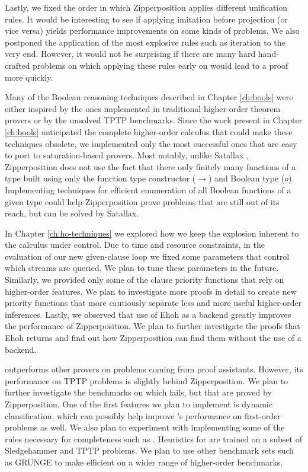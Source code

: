 Lastly, we fixed the order in which Zipperposition applies different unification
rules. It would be interesting to see if applying imitation before projection
(or vice versa) yields performance improvements on some kinds of problems. 
We also postponed the application of the most explosive rules such as iteration
to the very end. However, it would not be surprising if there are many hard hand-crafted
problems on which applying these rules early on would lead to a proof more quickly.

 Many of the Boolean reasoning
techniques described in Chapter \ref{ch:bools} were either inspired by the ones
implemented in traditional higher-order theorem provers or by the unsolved TPTP
benchmarks. Since the work present in Chapter \ref{ch:bools} anticipated the
complete higher-order calculus that could make these techniques obsolete, we
implemented only the most successful ones that are easy to port to
saturation-based provers.  Most notably, unlike Satallax
\cite{cb-2013-satallax}, Zipperposition does not use the fact that there only
finitely many functions of a type built using only the function type constructor
($\rightarrow$) and Boolean type ($o$). Implementing techniques for efficient
enumeration of all Boolean functions of a given type could help Zipperposition
prove problems that are still out of its reach, but can be solved by Satallax.

In Chapter \ref{ch:ho-techniques} we explored how we keep the explosion inherent
to the \osup{} calculus under control. Due to time and resource
constraints, in the evaluation of our new given-clause loop we fixed some
parameters that control which streams are queried. We plan to tune these
parameters in the future.  Similarly, we provided only some of the clause
priority functions that rely on higher-order features. We plan to investigate
more proofs in detail to create new priority functions that more cautiously
separate less and more useful higher-order inferences. Lastly, we observed that
use of Ehoh as a backend greatly improves the performance of Zipperposition. We
plan to further investigate the proofs that Ehoh returns and find out how
Zipperposition can find them without the use of a backend.

 \ehohii{} outperforms other provers on
problems coming from proof assistants. However, its performance on TPTP problems is
slightly behind Zipperposition. We plan to further investigate the benchmarks on
which \ehohii{} fails, but that are proved by Zipperposition. One of the first
features we plan to implement is dynamic clausification, which can possibly help
improve \ehohii{}'s performance on first-order problems as well. We also plan to
experiment with implementing some of the \osup{} rules necessary for
completeness such as . Heuristics for \ehohii{} are trained on
a subset of Sledgehammer and TPTP problems. We plan to use other benchmark sets
such as GRUNGE \cite{bgksu-19-grunge} to make \ehohii{} efficient on a wider range of higher-order
benchmarks.

